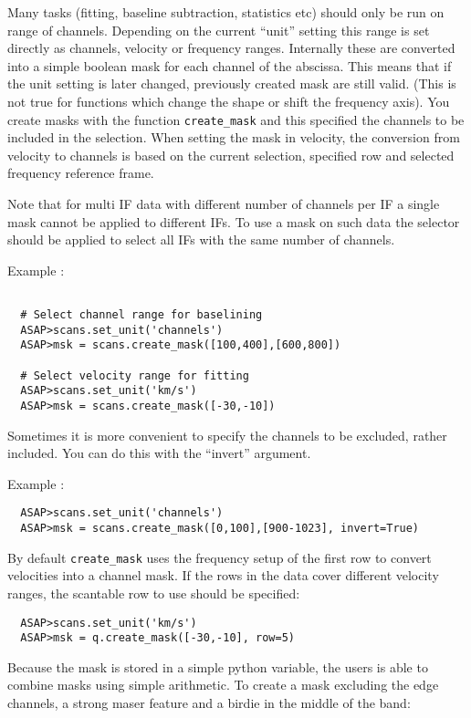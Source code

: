 \documentclass[11pt]{article}
\newcommand{\cmd}[1]{{\tt #1}}
\begin{document}

Many tasks (fitting, baseline subtraction, statistics etc) should only
be run on range of channels. Depending on the current ``unit'' setting
this range is set directly as channels, velocity or frequency
ranges. Internally these are converted into a simple boolean mask for
each channel of the abscissa. This means that if the unit setting is
later changed, previously created mask are still valid. (This is not
true for functions which change the shape or shift the frequency
axis).  You create masks with the function \cmd{create\_mask} and this
specified the channels to be included in the selection. When setting
the mask in velocity, the conversion from velocity to channels is
based on the current selection, specified row and selected frequency
reference frame.


Note that for multi IF data with different number of channels per IF a
single mask cannot be applied to different IFs. To use a mask on such
data the selector should be applied to select all IFs with the same
number of channels.

Example :
\begin{verbatim}

  # Select channel range for baselining
  ASAP>scans.set_unit('channels')
  ASAP>msk = scans.create_mask([100,400],[600,800])

  # Select velocity range for fitting
  ASAP>scans.set_unit('km/s')
  ASAP>msk = scans.create_mask([-30,-10])
\end{verbatim}

Sometimes it is more convenient to specify the channels to be
excluded, rather included.  You can do this with the ``invert''
argument.

Example :
\begin{verbatim}
  ASAP>scans.set_unit('channels')
  ASAP>msk = scans.create_mask([0,100],[900-1023], invert=True)
\end{verbatim}

By default \cmd{create\_mask} uses the frequency setup of the first row
to convert velocities into a channel mask. If the rows in the data
cover different velocity ranges, the scantable row to use should be
specified:

\begin{verbatim}
  ASAP>scans.set_unit('km/s')
  ASAP>msk = q.create_mask([-30,-10], row=5)
\end{verbatim}

Because the mask is stored in a simple python variable, the users is
able to combine masks using simple arithmetic. To create a mask
excluding the edge channels, a strong maser feature and a birdie in
the middle of the band:
\end{document}
